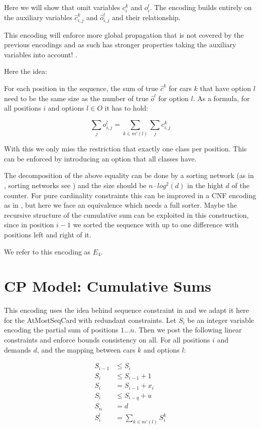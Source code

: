 \documentclass[]{llncs}
\newcommand{\TODO}[1]{ {\color{red}{#1} }}
\newcommand{\AtMostSeqCard}{AtMostSeqCard }
\begin{document}
Here we will show that omit variables $c^k_{i}$ and $o^l_{i}$. The
encoding builds entirely on the auxiliary variables $\hat{c}^k_{i,j}$
and $\hat{o}^l_{i,j}$ and their relationship.

This encoding will enforce more global propagation that is not covered
by the previous encodings and as such has stronger properties taking the
auxiliary variables into account! \TODO{give example which propagation
is missing}.

Here the idea: 

For each position in the sequence, the sum of true $\hat{c}^k$ for cars
$k$ that have option $l$ need to be the same size as the number of true
$\hat{o}^l$ for option $l$. As a formula, for all positions $i$ and
options $ l \in O$ it has to hold: 

$$ \sum_{j} o^l_{i,j} = \sum_{k \in m'(l)} \sum_j c^k_{i,j} $$

With this we only miss the restriction that exactly one class per
position. This can be enforced by introducing an option that all classes
have. 

The decomposition of the above equality  can be done by a sorting
network (as in \cite{Een06}, sorting networks see \cite{Batcher68}) and
the size should be $n\cdot log^2 (d) $ in the hight $d$ of the counter.
For pure cardinality constraints this can be improved in a CNF encoding
as in \cite{Asin11,Codish10}, but here we face an equivalence which
needs a full sorter. Maybe the recursive structure of the cumulative sum
can be exploited in this construction, since in position $i-1$ we sorted
the sequence with up to one difference with positions left and right of
it. 

We refer to this encoding as $E_4$.

\section{CP Model: Cumulative Sums}

This encoding uses the idea behind sequence constraint in \cite{Brand07}
and we adapt it here for the \AtMostSeqCard with redundant constraints.
Let $S_i$ be an integer variable encoding the partial sum of positions
$1\ldots n$. Then we post the following linear constraints and enforce
bounds consistency on all. For all positions $i$ and demands $d$, and
the mapping between cars $k$ and options $l$: 

\begin{align}
    S_{i-1} & \leq S_i \\
    S_i & \leq S_{i-1} + 1 \\
    S_i & = S_{i-1} + x_i \\
    S_i & \leq S_{i-q} + u  \\
    S_n & = d \\
    S^l_i & = \sum_{k \in m'(l)} S^k_i
\end{align}
\end{document}
